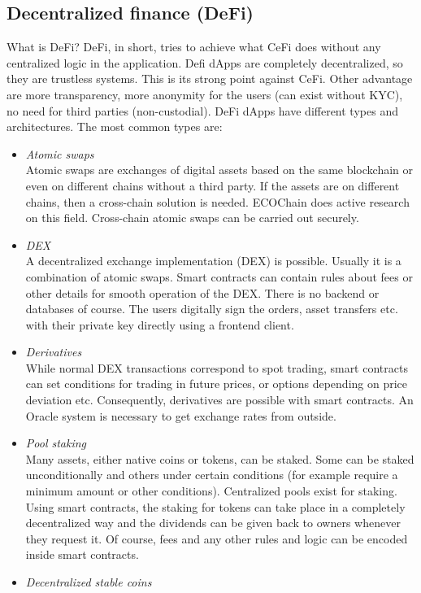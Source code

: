 \documentclass{article}
\begin{document}
\subsection{Decentralized finance (DeFi)}
What is DeFi? DeFi, in short, tries to achieve what CeFi does without any centralized logic in the application. Defi dApps are completely decentralized, so they are trustless systems. This is its strong point against CeFi. Other advantage are more transparency, more anonymity for the users (can exist without KYC), no need for third parties (non-custodial).
DeFi dApps have different types and architectures. The most common types are:
\begin{itemize}
\item \emph{Atomic swaps}\\
Atomic swaps are exchanges of digital assets based on the same blockchain or even on different chains without a third party. If the assets are on different chains, then a cross-chain solution is needed. ECOChain does active research on this field. Cross-chain atomic swaps can be carried out securely.
\item \emph{DEX}\\
A decentralized exchange implementation (DEX) is possible. Usually it is a combination of atomic swaps. Smart contracts can contain rules about fees or other details for smooth operation of the DEX. There is no backend or databases of course. The users digitally sign the orders, asset transfers etc. with their private key directly using a frontend client.
\item \emph{Derivatives}\\
While normal DEX transactions correspond to spot trading, smart contracts can set conditions for trading in future prices, or options depending on price deviation etc. Consequently, derivatives are possible with smart contracts. An Oracle system is necessary to get exchange rates from outside.
\item \emph{Pool staking}\\
Many assets, either native coins or tokens, can be staked. Some can be staked unconditionally and others under certain conditions (for example require a minimum amount or other conditions). Centralized pools exist for staking. Using smart contracts, the staking for tokens can take place in a completely decentralized way and the dividends can be given back to owners whenever they request it. Of course, fees and any other rules and logic can be encoded inside smart contracts.
\item \emph{Decentralized stable coins}\\

\end{itemize}
\end{document}
